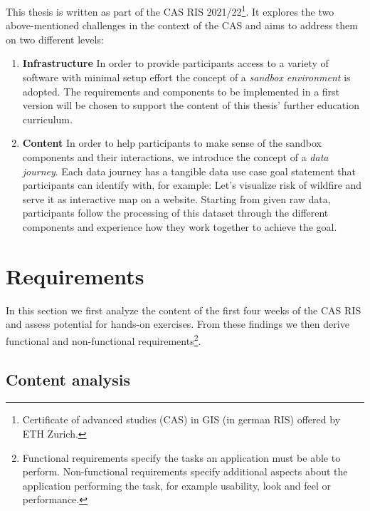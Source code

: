\documentclass[11pt, a4paper, oneside, parskip=full-]{scrartcl}
\begin{document}
This thesis is written as part of the CAS RIS 2021/22\footnote{Certificate of advanced studies (CAS) in GIS (in german
RIS) offered by ETH Zurich.}. It explores the two above-mentioned challenges in the context of the CAS and aims to
address them on two different levels:
\begin{enumerate}
  \item \textbf{Infrastructure} In order to provide participants access to a variety of software with minimal setup
  effort the concept of a \emph{sandbox environment} is adopted. The requirements and components to be implemented in a
  first version will be chosen to support the content of this thesis' further education curriculum.
  \item \textbf{Content} In order to help participants to make sense of the sandbox components and their interactions,
  we introduce the concept of a \emph{data journey}. Each data journey has a tangible data use case goal statement that
  participants can identify with, for example: Let's visualize risk of wildfire and serve it as interactive map on a
  website. Starting from given raw data, participants follow the processing of this dataset through the different
  components and experience how they work together to achieve the goal.
\end{enumerate}


\section{Requirements}
In this section we first analyze the content of the first four weeks of the CAS RIS and assess potential for hands-on
exercises. From these findings we then derive functional and non-functional requirements\footnote{Functional
requirements specify the tasks an application must be able to perform. Non-functional requirements specify additional
aspects about the application performing the task, for example usability, look and feel or performance. }.

\subsection{Content analysis}
\end{document}
